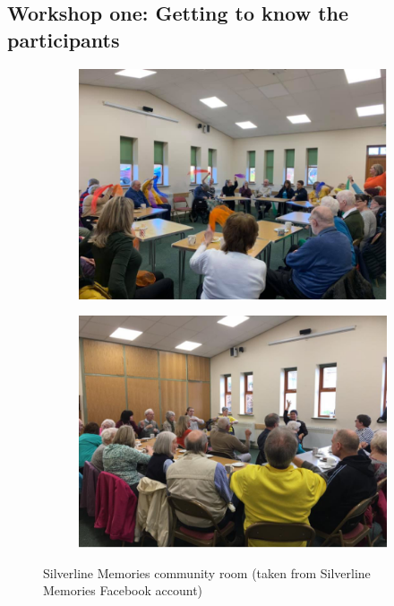 \subsection{Workshop one: Getting to know the participants}
\label{StudyOne:W1}
\begin{figure}[htp]
\centering
\begin{subfigure}{.5\textwidth}
  \centering
  \includegraphics[width=.8\linewidth]{Images/ChapterFour/SilverlineCommunityRoomOne.png}
  \label{fig:communityRoomOne}
\end{subfigure}%
\begin{subfigure}{.5\textwidth}
  \centering
  \includegraphics[width=.8\linewidth]{Images/ChapterFour/SilverlineMemoriesCommunityRoomTwo.png}
  \label{fig:communityRoomTwo}
\end{subfigure}
\caption{Silverline Memories community room (taken from Silverline Memories Facebook account)}
\label{fig:SilverlineCommunityRoom}
\end{figure}

